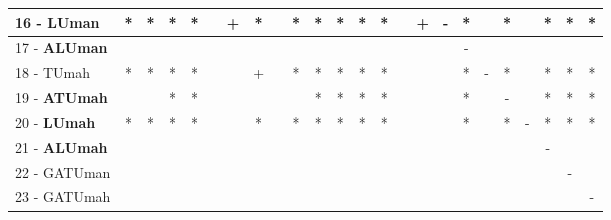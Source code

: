 \begin{table}[h]
\begin{center}
\begin{tabular}{lcc|cc|cc|cc|cc|cc|cc|cc|cc|cc|cc|c}
16 - \textbf{LUman}	& * & * & * & * &   & + & * &   & * & * & * & * & * &   & + & - & * &   & * &   & * & * & * \\ \hline
17 - \textbf{ALUman}	&   &   &   &   &   &   &   &   &   &   &   &   &   &   &   &   & - &   &   &   &   &   &   \\
18 - TUmah	& * & * & * & * &   &   & + &   & * & * & * & * & * &   &   &   & * & - & * &   & * & * & * \\ \hline
19 - \textbf{ATUmah}	&   &   & * & * &   &   &   &   &   & * & * & * & * &   &   &   & * &   & - &   & * & * & * \\
20 - \textbf{LUmah}	& * & * & * & * &   &   & * &   & * & * & * & * & * &   &   &   & * &   & * & - & * & * & * \\ \hline
21 - \textbf{ALUmah}	&   &   &   &   &   &   &   &   &   &   &   &   &   &   &   &   &   &   &   &   & - &   &   \\
22 - GATUman	&   &   &   &   &   &   &   &   &   &   &   &   &   &   &   &   &   &   &   &   &   & - &   \\ \hline
23 - GATUmah	&   &   &   &   &   &   &   &   &   &   &   &   &   &   &   &   &   &   &   &   &   &   & - \\\end{tabular}
\label{stratsALCKappaFriedRF}
\end{center}
\end{table}